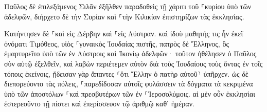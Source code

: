 \documentclass{openreader}
\begin{document}
Παῦλος δὲ ἐπιλεξάμενος Σιλᾶν ἐξῆλθεν παραδοθεὶς τῇ χάριτι τοῦ ⸀κυρίου ὑπὸ τῶν ἀδελφῶν, 
διήρχετο δὲ τὴν Συρίαν καὶ ⸀τὴν Κιλικίαν ἐπιστηρίζων τὰς ἐκκλησίας. 

Κατήντησεν δὲ ⸀καὶ εἰς Δέρβην καὶ ⸀εἰς Λύστραν. καὶ ἰδοὺ μαθητής τις ἦν ἐκεῖ ὀνόματι Τιμόθεος, υἱὸς ⸀γυναικὸς Ἰουδαίας πιστῆς, πατρὸς δὲ Ἕλληνος, 
ὃς ἐμαρτυρεῖτο ὑπὸ τῶν ἐν Λύστροις καὶ Ἰκονίῳ ἀδελφῶν· 
τοῦτον ἠθέλησεν ὁ Παῦλος σὺν αὐτῷ ἐξελθεῖν, καὶ λαβὼν περιέτεμεν αὐτὸν διὰ τοὺς Ἰουδαίους τοὺς ὄντας ἐν τοῖς τόποις ἐκείνοις, ᾔδεισαν γὰρ ἅπαντες ⸂ὅτι Ἕλλην ὁ πατὴρ αὐτοῦ⸃ ὑπῆρχεν. 
ὡς δὲ διεπορεύοντο τὰς πόλεις, ⸀παρεδίδοσαν αὐτοῖς φυλάσσειν τὰ δόγματα τὰ κεκριμένα ὑπὸ τῶν ἀποστόλων ⸀καὶ πρεσβυτέρων τῶν ἐν ⸀Ἱεροσολύμοις. 
αἱ μὲν οὖν ἐκκλησίαι ἐστερεοῦντο τῇ πίστει καὶ ἐπερίσσευον τῷ ἀριθμῷ καθ’ ἡμέραν. 
\end{document}

